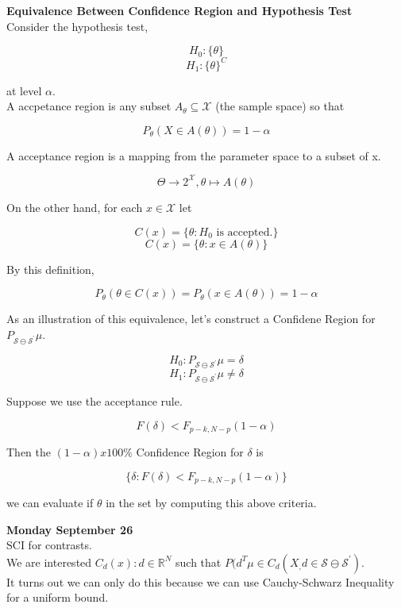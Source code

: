 \documentclass[11pt,fleqn]{book} %
\begin{document}
\textbf{Equivalence Between Confidence Region and Hypothesis Test}\\

Consider the hypothesis test, 

		$$H_0: \{\theta\} $$
		$$H_1: \{\theta\}^C$$

at level $\alpha$. \\


A accpetance region is any subset $A_\theta \subseteq \mathcal{X}$ (the sample space) so that

		$$P_\theta(X \in A(\theta)) = 1 - \alpha $$

A acceptance region is a mapping from the parameter space to a subset of x. 

		$$\Theta \rightarrow 2^{\mathcal{X}}, \theta \mapsto A(\theta)$$

On the other hand, for each $x \in \mathcal{X}$ let

		$$C(x) = \{\theta: H_0 \text{ is accepted.} \} $$
		$$C(x) = \{\theta: x \in A(\theta) \} $$

By this definition, 

		$$P_\theta(\theta \in C(x)) = P_\theta \left(x \in A(\theta)\right) = 1-\alpha$$

As an illustration of this equivalence, let's construct a Confidene Region for $P_{\mathcal{S} \ominus \mathcal{S}^\prime} \mu$.

		$$H_0: P_{\mathcal{S} \ominus \mathcal{S}^\prime} \mu = \delta $$
		$$H_1: P_{\mathcal{S} \ominus \mathcal{S}^\prime} \mu \neq \delta $$

Suppose we use the acceptance rule. 

		$$F(\delta) < F_{p-k, N-p}(1-\alpha) $$

Then the $(1-\alpha)x 100\%$ Confidence Region for $\delta$ is

		$$\{\delta: F(\delta) < F_{p-k, N-p}(1-\alpha) \} $$

we can evaluate if $\theta$ in the set by computing this above criteria. 


\textbf{Monday September 26}\\

SCI for contrasts.\\

We are interested $C_d(x): d \in \mathbb{R}^N$ such that $P(d^T \mu \in C_d(X_, d \in \mathcal{S} \ominus \mathcal{S}^\prime)$.\\

It turns out we can only do this because we can use Cauchy-Schwarz Inequality for a uniform bound.\\
\end{document}
